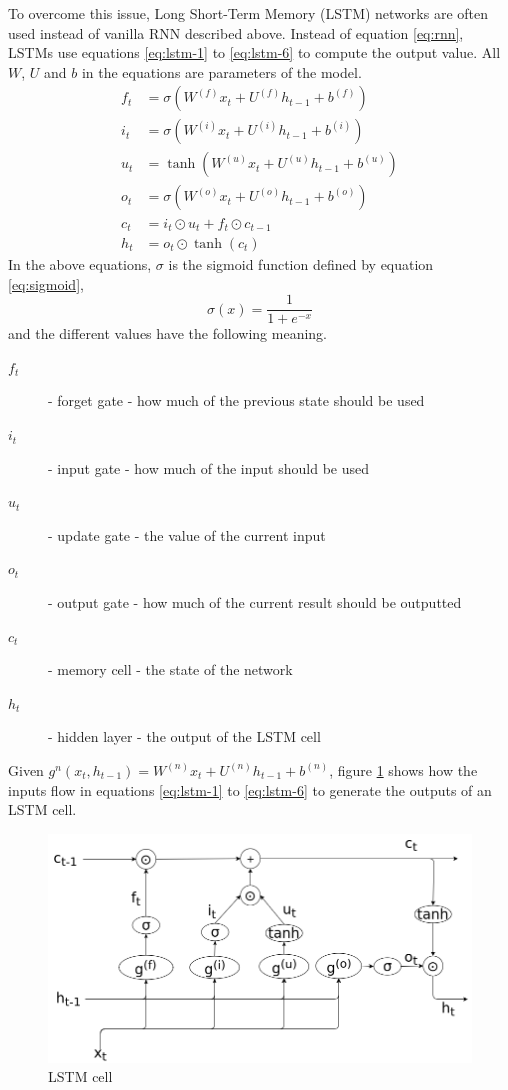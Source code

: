 To overcome this issue, Long Short-Term Memory (LSTM) networks
\cite{Hochreiter:1997:LSM:1246443.1246450} are often used instead of vanilla RNN
described above. Instead of equation \ref{eq:rnn}, LSTMs use equations
\ref{eq:lstm-1} to \ref{eq:lstm-6} to compute the output value. All $W$, $U$ and
$b$ in the equations are parameters of the model.
\begin{align}
  f_t &= \sigma \left( W^{(f)}x_t + U^{(f)}h_{t - 1} + b^{(f)} \right) \label{eq:lstm-1}\\
  i_t &= \sigma \left( W^{(i)}x_t + U^{(i)}h_{t - 1} + b^{(i)} \right)\\
  u_t &= \tanh \left( W^{(u)}x_t + U^{(u)}h_{t - 1} + b^{(u)} \right)\\
  o_t &= \sigma \left( W^{(o)}x_t + U^{(o)}h_{t - 1} + b^{(o)} \right)\\
  c_t &= i_t \odot u_t + f_t \odot c_{t - 1}\\
  h_t &= o_t \odot \tanh(c_t) \label{eq:lstm-6}
\end{align}
In the above equations, $\sigma$ is the sigmoid function defined by equation
\ref{eq:sigmoid},
\begin{equation}
  \label{eq:sigmoid}
  \sigma(x) = \frac{1}{1 + e^{-x}}
\end{equation}
and the different values have the following meaning.
\begin{description}
\item[$f_t$] - forget gate - how much of the previous state should be used
\item[$i_t$] - input gate - how much of the input should be used
\item[$u_t$] - update gate - the value of the current input
\item[$o_t$] - output gate - how much of the current result should be outputted
\item[$c_t$] - memory cell - the state of the network
\item[$h_t$] - hidden layer - the output of the LSTM cell
\end{description}
Given $g^n(x_t, h_{t-1}) = W^{(n)}x_t + U^{(n)} h_{t-1} + b^{(n)}$, figure
\ref{fig:lstm-cell} shows how the inputs flow in equations \ref{eq:lstm-1} to
\ref{eq:lstm-6} to generate the outputs of an LSTM cell.
\begin{figure}[tb]
  \begin{center}
    \includegraphics[width=14cm]{./images/lstm-cell.png}
    \caption{\label{fig:lstm-cell}LSTM cell}
  \end{center}
\end{figure}
